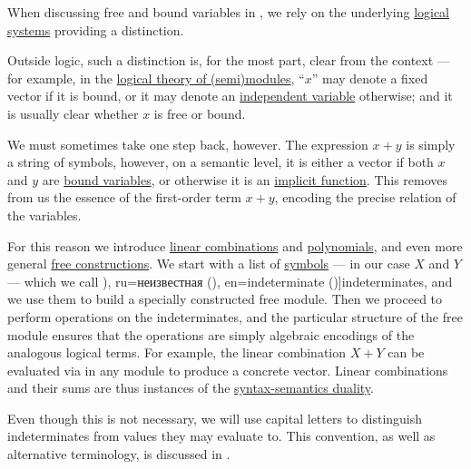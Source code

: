 \begin{concept}\label{con:indeterminate}
  When discussing free and bound variables in , we rely on the underlying \hyperref[con:logical_system]{logical systems} providing a distinction.

  Outside logic, such a distinction is, for the most part, clear from the context --- for example, in the \hyperref[def:semimodule/theory]{logical theory of (semi)modules}, \enquote{\( x \)} may denote a fixed vector if it is bound, or it may denote an \hyperref[con:variable_dependence]{independent variable} otherwise; and it is usually clear whether \( x \) is free or bound.

  We must sometimes take one step back, however. The expression \( x + y \) is simply a string of symbols, however, on a semantic level, it is either a vector if both \( x \) and \( y \) are \hyperref[con:variable_binding]{bound variables}, or otherwise it is an \hyperref[con:variable_dependence]{implicit function}. This removes from us the essence of the first-order term \( x + y \), encoding the precise relation of the variables.

  For this reason we introduce \hyperref[def:linear_combination]{linear combinations} and \hyperref[def:polynomial_algebra]{polynomials}, and even more general \hyperref[con:free_construction]{free constructions}. We start with a list of \hyperref[def:formal_language/symbol]{symbols} --- in our case \( X \) and \( Y \) --- which we call \term[bg=неизвестно (\cite[405]{Обрешков1962ВисшаАлгебра}), ru=неизвестная (\cite[131]{Курош1968КурсВысшейАлгебры}), en=indeterminate (\cite[def. III.1.19]{Aluffi2009Algebra})]{indeterminates}, and we use them to build a specially constructed free module. Then we proceed to perform operations on the indeterminates, and the particular structure of the free module ensures that the operations are simply algebraic encodings of the analogous logical terms. For example, the linear combination \( X + Y \) can be evaluated via  in any module to produce a concrete vector. Linear combinations and their sums are thus instances of the \hyperref[con:syntax_semantics_duality]{syntax-semantics duality}.

  Even though this is not necessary, we will use capital letters to distinguish indeterminates from values they may evaluate to. This convention, as well as alternative terminology, is discussed in .
\end{concept}

